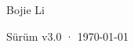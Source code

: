 \begin{titlepage}
\vfill
{\LARGE\sffamily Bojie Li\par}
\vspace{0.7cm}
{\small\sffamily\color{structurecolor!80} Sürüm v3.0 · \today\par}
\vspace{1.2cm}
\end{titlepage}
